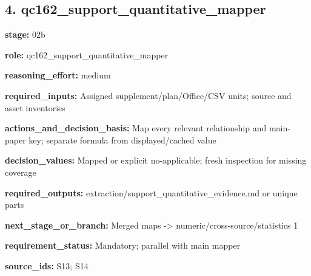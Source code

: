 \documentclass[10pt,a4paper]{article}
\begin{document}
\subsection*{4.\allowbreak{} qc162\_\allowbreak{}support\_\allowbreak{}quantitative\_\allowbreak{}mapper}
\textbf{stage:} 02b\par
\textbf{role:} qc162\_\allowbreak{}support\_\allowbreak{}quantitative\_\allowbreak{}mapper\par
\textbf{reasoning\_\allowbreak{}effort:} medium\par
\textbf{required\_\allowbreak{}inputs:} Assigned supplement/\allowbreak{}plan/\allowbreak{}Office/\allowbreak{}CSV units; source and asset inventories\par
\textbf{actions\_\allowbreak{}and\_\allowbreak{}decision\_\allowbreak{}basis:} Map every relevant relationship and main-\allowbreak{}paper key; separate formula from displayed/\allowbreak{}cached value\par
\textbf{decision\_\allowbreak{}values:} Mapped or explicit no-\allowbreak{}applicable; fresh inspection for missing coverage\par
\textbf{required\_\allowbreak{}outputs:} extraction/\allowbreak{}support\_\allowbreak{}quantitative\_\allowbreak{}evidence.\allowbreak{}md or unique parts\par
\textbf{next\_\allowbreak{}stage\_\allowbreak{}or\_\allowbreak{}branch:} Merged maps -\allowbreak{}> numeric/\allowbreak{}cross-\allowbreak{}source/\allowbreak{}statistics 1\par
\textbf{requirement\_\allowbreak{}status:} Mandatory; parallel with main mapper\par
\textbf{source\_\allowbreak{}ids:} S13; S14\par
\end{document}
